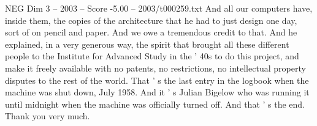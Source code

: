\begin{textsample}{NEG Dim 3 – 2003 – Score -5.00 – 2003/t000259.txt}
And all our computers have, inside them, the copies of the architecture that he had to just design one day, sort of on pencil and paper.
And we owe a tremendous credit to that.
And he explained, in a very generous way, the spirit that brought all these different people to the Institute for Advanced Study in the ' 40s to do this project, and make it freely available with no patents, no restrictions, no intellectual property disputes to the rest of the world.
That ' s the last entry in the logbook when the machine was shut down, July 1958.
And it ' s Julian Bigelow who was running it until midnight when the machine was officially turned off.
And that ' s the end.
Thank you very much.

\end{textsample}
